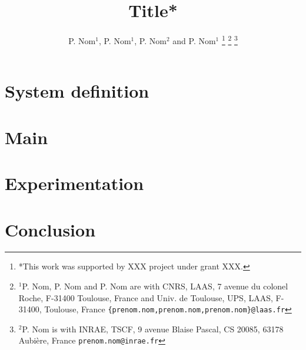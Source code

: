 \documentclass[letterpaper, 10 pt, conference]{ieeeconf}  %
\title{\LARGE \bf
Title*
}
\author{P. Nom$^{1}$, P. Nom$^{1}$, P. Nom$^{2}$ and P. Nom$^{1}$ %
\thanks{*This work was supported by XXX project under grant XXX.}%
%
\thanks{$^{1}$P. Nom, P. Nom and P. Nom are with CNRS, LAAS,
        7 avenue du colonel Roche, F-31400 Toulouse, France and
        Univ. de Toulouse, UPS, LAAS, F-31400, Toulouse, France
        {\tt\small \{prenom.nom,prenom.nom,prenom.nom\}@laas.fr}}%
\thanks{$^{2}$P. Nom is with INRAE, TSCF,  9 avenue Blaise Pascal, 
        CS 20085, 63178 Aubière, France 
        {\tt\small prenom.nom@inrae.fr}}
}
\begin{document}
\maketitle
\thispagestyle{empty}
\pagestyle{empty}





\section{System definition} \label{System definition}

\section{Main} \label{Main}

\section{Experimentation} \label{Experimentation}

\section{Conclusion} \label{Conclusion}





\nocite{*}




\end{document}
